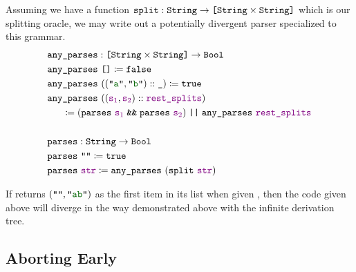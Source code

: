     Assuming we have a function $\oftype{\fname{split}}{\String \typeto \typelistp{\typeprod{\String}{\String}}}$ which is our splitting oracle, we may write out a potentially divergent parser specialized to this grammar.
    \begin{align*}
      & \fname{any\_parses} \oftypesep \typelistp{\typeprod{\String}{\String}} \typeto \Bool \\
      & \fname{any\_parses}~\nil \defeq \false \\
      & \fname{any\_parses}~(\cons{(\str{a}, \str{b})}{\termhole}) \defeq \true \\
      & \fname{any\_parses}~(\cons{(\farg{s$_1$}, \farg{s$_2$})}{\farg{rest\_splits}}) \\
      & \phantom{\fname{any}} \defeq \left(\fname{parses}~\farg{s$_1$} \booland \fname{parses}~\farg{s$_2$}\right) \boolor \fname{any\_parses}~\farg{rest\_splits} \\
      \\
      & \fname{parses} \oftypesep \String \typeto \Bool \\
      & \fname{parses}~\str{} \defeq \true \\
      & \fname{parses}~\farg{str} \defeq \fname{any\_parses}~(\fname{split}~\farg{str})
    \end{align*}

    If  returns $(\str{}, \str{ab})$ as the first item in its list when given , then the code given above will diverge in the way demonstrated above with the infinite derivation tree.

  \subsection{Aborting Early} \label{sec:solve-nontermination}

